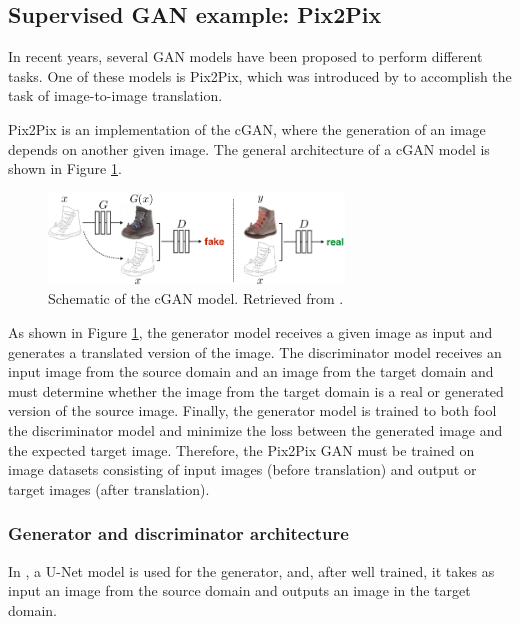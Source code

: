 \subsection{Supervised GAN example: Pix2Pix}
\label{subsection:pix2pix}

In recent years, several \ac{GAN} models have been proposed to perform different tasks. One of these models is Pix2Pix, which was introduced by \citet{isola2018imagetoimage} to accomplish the task of image-to-image translation.

Pix2Pix is an implementation of the \ac{cGAN}, where the generation of an image depends on another given image. The general architecture of a \ac{cGAN} model is shown in Figure \ref{fig:cGAN}.

\begin{figure}[!htb]
  \centering
  \includegraphics[width=0.70\textwidth]{Images/Training-a-conditional-GAN-to-map-edgesphoto-The-discriminator-D-learns-to-classify.jpg}
  \caption[Schematic of the \ac{cGAN} model.]{Schematic of the \ac{cGAN} model. Retrieved from \cite{isola2018imagetoimage}.}
  \label{fig:cGAN}
\end{figure}


As shown in Figure \ref{fig:cGAN}, the generator model receives a given image as input and generates a translated version of the image. The discriminator model receives an input image from the source domain and an image from the target domain and must determine whether the image from the target domain is a real or generated version of the source image. Finally, the generator model is trained to both fool the discriminator model and minimize the loss between the generated image and the expected target image. Therefore, the Pix2Pix \ac{GAN} must be trained on image datasets consisting of input images (before translation) and output or target images (after translation).


\subsubsection*{Generator and discriminator architecture}

In \cite{isola2018imagetoimage}, a U-Net model is used for the generator, and, after well trained, it takes as input an image from the source domain and outputs an image in the target domain. 

